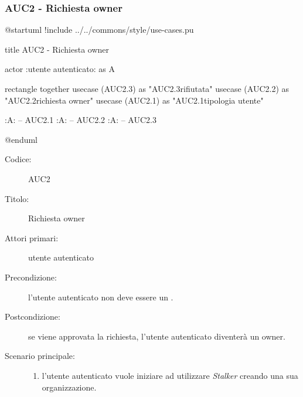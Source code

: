 \documentclass[casi-duso]{subfiles}
\begin{document}
\subsubsection{AUC2 - Richiesta owner}%
\label{subsub:AUC2}

\begin{plantuml}
@startuml
!include ../../commons/style/use-cases.pu

title AUC2 - Richiesta owner

actor :utente autenticato: as A

rectangle {
  together {
    usecase (AUC2.3) as "AUC2.3\nRichiesta rifiutata"
    usecase (AUC2.2) as "AUC2.2\nInvio richiesta owner"
    usecase (AUC2.1) as "AUC2.1\nVerifica tipologia utente"
  }
}

:A: -- AUC2.1
:A: -- AUC2.2
:A: -- AUC2.3

@enduml
\end{plantuml}

\begin{description}
  \item[Codice:] AUC2
  \item[Titolo:] Richiesta owner
  \item[Attori primari:] utente autenticato
  \item[Precondizione:] l'utente autenticato non deve essere un .
  \item[Postcondizione:] se viene approvata la richiesta, l'utente autenticato diventerà un owner.
  \item[Scenario principale:]
  \begin{enumerate}
    \item l'utente autenticato vuole iniziare ad utilizzare \emph{Stalker} creando una sua organizzazione.
  \end{enumerate}
\end{description}
\end{document}

